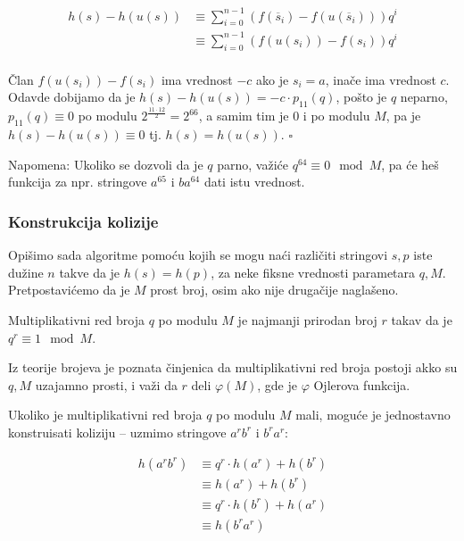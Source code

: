 \begin{align*}
h(s) - h(u(s)) & \equiv \sum_{i=0}^{n-1}(f(\overline{s}_i) - f(u(\overline{s}_i))) q^i \\
               & \equiv \sum_{i=0}^{n-1}(f(u(s_i)) - f(s_i)) q^i \\
\end{align*}

\v Clan $f(u(s_i)) - f(s_i)$ ima vrednost $-c$ ako je $s_i = a$, ina\v ce ima vrednost $c$.  Odavde dobijamo da je $h(s) - h(u(s)) = -c\cdot p_{11}(q)$, po\v sto je $q$ neparno, $p_{11}(q) \equiv 0$ po modulu $2^\frac{11\cdot 12}{2} = 2^{66}$, a samim tim je $0$ i po modulu $M$, pa je $h(s) - h(u(s)) \equiv 0$ tj. $h(s) = h(u(s))$. \hfill $\square$

Napomena: Ukoliko se dozvoli da je $q$ parno, va\v zi\' ce $q^{64} \equiv 0 \mod M$, pa \' ce he\v s funkcija za npr. stringove $a^{65}$ i $ba^{64}$ dati istu vrednost.

\subsubsection{Konstrukcija kolizije}

Opi\v simo sada algoritme pomo\' cu kojih se mogu na\' ci razli\v citi stringovi $s,p$ iste du\v zine $n$ takve da je $h(s) = h(p)$, za neke fiksne vrednosti parametara $q,M$. Pretpostavi\' cemo da je $M$ prost broj, osim ako nije druga\v cije nagla\v seno.

\begin{dfn}
Multiplikativni red broja $q$ po modulu $M$ je najmanji prirodan broj $r$ takav da je $q^r \equiv 1 \mod M$.
\end{dfn}

Iz teorije brojeva je poznata \v cinjenica da multiplikativni red broja postoji akko su $q,M$ uzajamno prosti, i va\v zi da $r$ deli $\varphi(M)$, gde je $\varphi$ Ojlerova funkcija.

Ukoliko je multiplikativni red broja $q$ po modulu $M$ mali, mogu\' ce je jednostavno konstruisati koliziju -- uzmimo stringove $a^rb^r$ i $b^ra^r$:

\begin{align*}
h(a^rb^r) & \equiv q^r \cdot h(a^r) + h(b^r) \\
          & \equiv h(a^r) + h(b^r) \\
          & \equiv q^r \cdot h(b^r) + h(a^r) \\
          & \equiv h(b^ra^r) \\
\end{align*}

